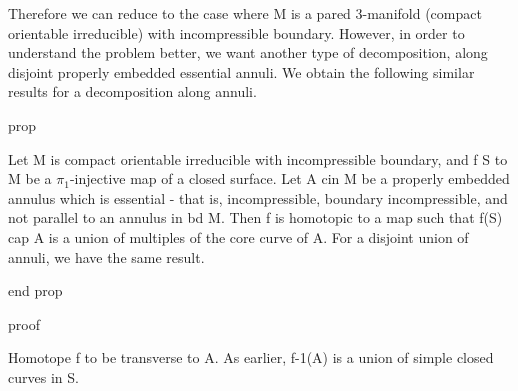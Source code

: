 Therefore we can reduce to the case where M is a pared 3-manifold (compact
orientable irreducible) with incompressible boundary. However, in order to
understand the problem better, we want another type of decomposition, along
disjoint properly embedded essential annuli. We obtain the following similar
results for a decomposition along annuli.

prop

Let M is compact orientable irreducible with incompressible boundary, and
f \colon S to M be a $\pi_1$-injective map of a closed surface. Let A cin M be
a properly embedded annulus which is essential - that is, incompressible,
boundary incompressible, and not parallel to an annulus in bd M. Then f is
homotopic to a map such that f(S) cap A is a union of multiples of the core
curve of A. For a disjoint union of annuli, we have the same result.

end prop

proof

Homotope f to be transverse to A. As earlier, f-1(A) is a union of simple
closed curves in S.
